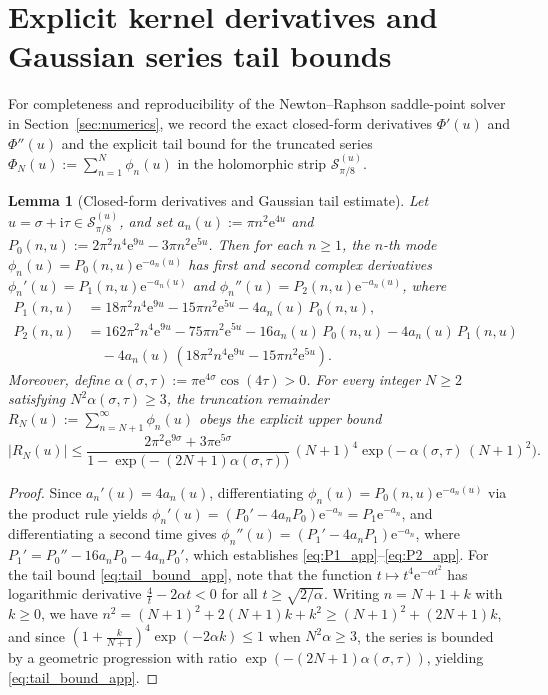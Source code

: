 \documentclass[11pt,a4paper,reqno]{amsart}
\newtheorem{lemma}[theorem]{Lemma}
\theoremstyle{definition}
\theoremstyle{remark}
\numberwithin{equation}{section}
\newcommand{\ii}{\mathrm{i}}
\newcommand{\ee}{\mathrm{e}}
\begin{document}
\appendix

\section{Explicit kernel derivatives and Gaussian series tail bounds}\label{app:derivatives}

For completeness and reproducibility of the Newton--Raphson saddle-point solver in Section~\ref{sec:numerics}, we record the exact closed-form derivatives $\Phi'(u)$ and $\Phi''(u)$ and the explicit tail bound for the truncated series $\Phi_N(u) := \sum_{n=1}^N \phi_n(u)$ in the holomorphic strip $\mathcal{S}_{\pi/8}^{(u)}$.

\begin{lemma}[Closed-form derivatives and Gaussian tail estimate]\label{lem:tail_bound}
Let $u = \sigma + \ii\tau \in \mathcal{S}_{\pi/8}^{(u)}$, and set $a_n(u) := \pi n^2 \ee^{4u}$ and $P_0(n,u) := 2\pi^2 n^4 \ee^{9u} - 3\pi n^2 \ee^{5u}$. Then for each $n \ge 1$, the $n$-th mode $\phi_n(u) = P_0(n,u)\ee^{-a_n(u)}$ has first and second complex derivatives $\phi_n'(u) = P_1(n,u)\ee^{-a_n(u)}$ and $\phi_n''(u) = P_2(n,u)\ee^{-a_n(u)}$, where
\begin{align}
P_1(n,u) &= 18\pi^2 n^4 \ee^{9u} - 15\pi n^2 \ee^{5u} - 4 a_n(u)\,P_0(n,u), \label{eq:P1_app} \\
P_2(n,u) &= 162\pi^2 n^4 \ee^{9u} - 75\pi n^2 \ee^{5u} - 16 a_n(u)\,P_0(n,u) - 4 a_n(u)\,P_1(n,u) \nonumber \\
&\quad - 4 a_n(u)\,\left(18\pi^2 n^4 \ee^{9u} - 15\pi n^2 \ee^{5u}\right). \label{eq:P2_app}
\end{align}
Moreover, define $\alpha(\sigma,\tau) := \pi\ee^{4\sigma}\cos(4\tau) > 0$. For every integer $N \ge 2$ satisfying $N^2\alpha(\sigma,\tau) \ge 3$, the truncation remainder $R_N(u) := \sum_{n=N+1}^\infty \phi_n(u)$ obeys the explicit upper bound
\begin{equation}\label{eq:tail_bound_app}
\big|R_N(u)\big| \le \frac{2\pi^2\ee^{9\sigma} + 3\pi\ee^{5\sigma}}{1 - \exp\!\big(-(2N+1)\alpha(\sigma,\tau)\big)}\,(N+1)^4 \exp\!\Big(-\alpha(\sigma,\tau)\,(N+1)^2\Big).
\end{equation}
\end{lemma}

\begin{proof}
Since $a_n'(u) = 4a_n(u)$, differentiating $\phi_n(u) = P_0(n,u)\ee^{-a_n(u)}$ via the product rule yields $\phi_n'(u) = (P_0' - 4a_n P_0)\ee^{-a_n} = P_1\ee^{-a_n}$, and differentiating a second time gives $\phi_n''(u) = (P_1' - 4a_n P_1)\ee^{-a_n}$, where $P_1' = P_0'' - 16a_n P_0 - 4a_n P_0'$, which establishes \eqref{eq:P1_app}--\eqref{eq:P2_app}. For the tail bound \eqref{eq:tail_bound_app}, note that the function $t \mapsto t^4\ee^{-\alpha t^2}$ has logarithmic derivative $\frac{4}{t} - 2\alpha t < 0$ for all $t \ge \sqrt{2/\alpha}$. Writing $n = N + 1 + k$ with $k \ge 0$, we have $n^2 = (N+1)^2 + 2(N+1)k + k^2 \ge (N+1)^2 + (2N+1)k$, and since $(1 + \frac{k}{N+1})^4 \exp(-2\alpha k) \le 1$ when $N^2\alpha \ge 3$, the series is bounded by a geometric progression with ratio $\exp(-(2N+1)\alpha(\sigma,\tau))$, yielding \eqref{eq:tail_bound_app}.
\end{proof}
\end{document}

